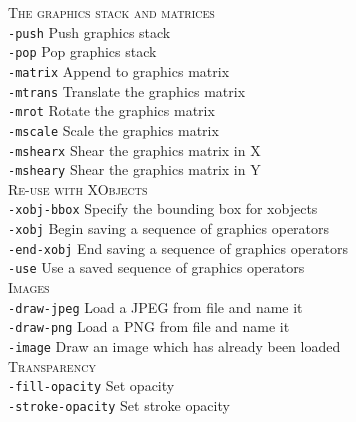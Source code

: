 \documentclass{book}
\begin{document}
{\begin{framed}
   \vspace{1.5mm}
   \noindent \textsc{The graphics stack and matrices}\\
   \noindent\verb!-push! Push graphics stack\\
   \noindent\verb!-pop! Pop graphics stack\\
   \noindent\verb!-matrix! Append to graphics matrix\\
   \noindent\verb!-mtrans! Translate the graphics matrix\\
   \noindent\verb!-mrot! Rotate the graphics matrix\\
   \noindent\verb!-mscale! Scale the graphics matrix\\
   \noindent\verb!-mshearx! Shear the graphics matrix in X\\
   \noindent\verb!-msheary! Shear the graphics matrix in Y\\

   \vspace{1.5mm}
   \noindent \textsc{Re-use with XObjects}\\
   \noindent\verb!-xobj-bbox! Specify the bounding box for xobjects\\
   \noindent\verb!-xobj! Begin saving a sequence of graphics operators\\
   \noindent\verb!-end-xobj! End saving a sequence of graphics operators\\
   \noindent\verb!-use! Use a saved sequence of graphics operators\\

   \vspace{1.5mm}
   \noindent \textsc{Images}\\
   \noindent\verb!-draw-jpeg! Load a JPEG from file and name it\\
   \noindent\verb!-draw-png! Load a PNG from file and name it\\
   \noindent\verb!-image! Draw an image which has already been loaded\\

   \vspace{1.5mm}
   \noindent \textsc{Transparency}\\
   \noindent\verb!-fill-opacity! Set opacity\\
   \noindent\verb!-stroke-opacity! Set stroke opacity\\


\end{framed}}
\end{document}
